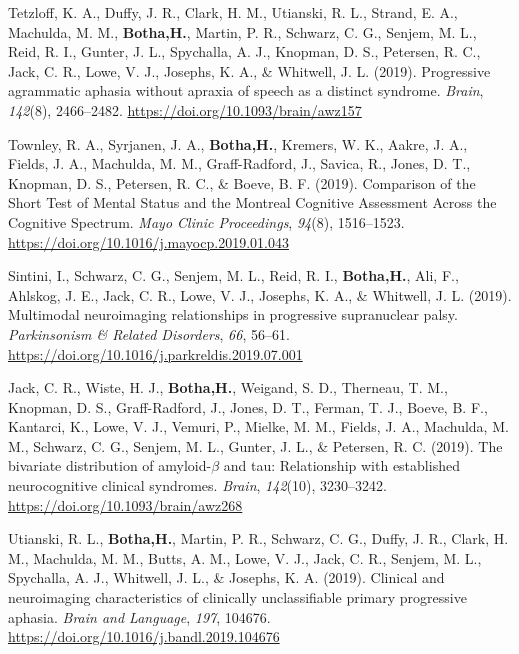 \documentclass[11pt, a4paper]{awesome-cv}
\begin{document}
\leavevmode\hypertarget{ref-tetzloff_progressive_2019}{}%
Tetzloff, K. A., Duffy, J. R., Clark, H. M., Utianski, R. L., Strand, E.
A., Machulda, M. M., \textbf{Botha,H.}, Martin, P. R., Schwarz, C. G.,
Senjem, M. L., Reid, R. I., Gunter, J. L., Spychalla, A. J., Knopman, D.
S., Petersen, R. C., Jack, C. R., Lowe, V. J., Josephs, K. A., \&
Whitwell, J. L. (2019). Progressive agrammatic aphasia without apraxia
of speech as a distinct syndrome. \emph{Brain}, \emph{142}(8),
2466--2482. \url{https://doi.org/10.1093/brain/awz157}

\leavevmode\hypertarget{ref-townley_comparison_2019}{}%
Townley, R. A., Syrjanen, J. A., \textbf{Botha,H.}, Kremers, W. K.,
Aakre, J. A., Fields, J. A., Machulda, M. M., Graff-Radford, J., Savica,
R., Jones, D. T., Knopman, D. S., Petersen, R. C., \& Boeve, B. F.
(2019). Comparison of the {Short} {Test} of {Mental} {Status} and the
{Montreal} {Cognitive} {Assessment} {Across} the {Cognitive} {Spectrum}.
\emph{Mayo Clinic Proceedings}, \emph{94}(8), 1516--1523.
\url{https://doi.org/10.1016/j.mayocp.2019.01.043}

\leavevmode\hypertarget{ref-sintini_multimodal_2019}{}%
Sintini, I., Schwarz, C. G., Senjem, M. L., Reid, R. I.,
\textbf{Botha,H.}, Ali, F., Ahlskog, J. E., Jack, C. R., Lowe, V. J.,
Josephs, K. A., \& Whitwell, J. L. (2019). Multimodal neuroimaging
relationships in progressive supranuclear palsy. \emph{Parkinsonism \&
Related Disorders}, \emph{66}, 56--61.
\url{https://doi.org/10.1016/j.parkreldis.2019.07.001}

\leavevmode\hypertarget{ref-jack_bivariate_2019}{}%
Jack, C. R., Wiste, H. J., \textbf{Botha,H.}, Weigand, S. D., Therneau,
T. M., Knopman, D. S., Graff-Radford, J., Jones, D. T., Ferman, T. J.,
Boeve, B. F., Kantarci, K., Lowe, V. J., Vemuri, P., Mielke, M. M.,
Fields, J. A., Machulda, M. M., Schwarz, C. G., Senjem, M. L., Gunter,
J. L., \& Petersen, R. C. (2019). The bivariate distribution of
amyloid-\(\beta\) and tau: Relationship with established neurocognitive
clinical syndromes. \emph{Brain}, \emph{142}(10), 3230--3242.
\url{https://doi.org/10.1093/brain/awz268}

\leavevmode\hypertarget{ref-utianski_clinical_2019}{}%
Utianski, R. L., \textbf{Botha,H.}, Martin, P. R., Schwarz, C. G.,
Duffy, J. R., Clark, H. M., Machulda, M. M., Butts, A. M., Lowe, V. J.,
Jack, C. R., Senjem, M. L., Spychalla, A. J., Whitwell, J. L., \&
Josephs, K. A. (2019). Clinical and neuroimaging characteristics of
clinically unclassifiable primary progressive aphasia. \emph{Brain and
Language}, \emph{197}, 104676.
\url{https://doi.org/10.1016/j.bandl.2019.104676}
\end{document}

